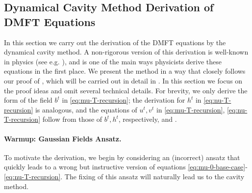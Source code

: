 \documentclass{article}
\newcommand{\1}{\mathbbm{1}}
\theoremstyle{plain}
\theoremstyle{definition}
\theoremstyle{remark}
\begin{document}
\subsection{Dynamical Cavity Method Derivation of DMFT Equations}
In this section we carry out the derivation of the DMFT equations by the dynamical cavity method. A non-rigorous version of this derivation is well-known in physics (see e.g. \cite{mezard1987spin}), and is one of the main ways physicists derive these equations in the first place. We present the method in a way that closely follows our proof of , which will be carried out in detail in . In this section we focus on the proof ideas and omit several technical details. For brevity, we only derive the form of the field $b^t$ in \eqref{eq:mu-T-recursion}; the derivation for $h^t$ in \eqref{eq:nu-T-recursion} is analogous, and the equations of $u^t,v^t$ in \eqref{eq:mu-T-recursion}, \eqref{eq:nu-T-recursion} follow from those of $b^t,h^t$, respectively, and .

\paragraph{Warmup: Gaussian Fields Ansatz.} To motivate the derivation, we begin by considering an (incorrect) ansatz that quickly leads to a wrong but instructive version of equations \eqref{eq:mu-0-base-case}-\eqref{eq:nu-T-recursion}. The fixing of this ansatz will naturally lead us to the cavity method.
\end{document}

